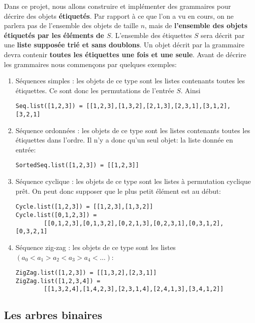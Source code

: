 \documentclass[11pt]{article}
\begin{document}
Dans ce projet, nous allons construire et implémenter des grammaires pour
décrire des objets \textbf{étiquetés}. Par rapport à ce que l'on a vu en
cours, on ne parlera pas de l'ensemble des objets de taille $n$, mais de
\textbf{l'ensemble des objets étiquetés par les éléments de $S$}. L'ensemble
des étiquettes $S$ sera décrit par une \textbf{liste supposée trié et sans
  doublons}. Un objet décrit par la grammaire devra contenir \textbf{toutes
  les étiquettes une fois et une seule}. Avant de décrire les grammaires nous
commençons par quelques exemples:
\begin{enumerate}
\item Séquences simples : les objets de ce type sont les listes contenants
  toutes les étiquettes. Ce sont donc les permutations de l'entrée $S$. Ainsi
\begin{verbatim}
Seq.list([1,2,3]) = [[1,2,3],[1,3,2],[2,1,3],[2,3,1],[3,1,2],[3,2,1]
\end{verbatim}
\item Séquence ordonnées : les objets de ce type sont les listes contenants
  toutes les étiquettes dans l'ordre. Il n'y a donc qu'un seul objet: la liste
  donnée en entrée:
\begin{verbatim}
SortedSeq.list([1,2,3]) = [[1,2,3]]
\end{verbatim}
\item Séquence cyclique : les objets de ce type sont les listes à permutation
  cyclique prêt. On peut donc supposer que le plus petit élément est au début:
\begin{verbatim}
Cycle.list([1,2,3]) = [[1,2,3],[1,3,2]]
Cycle.list([0,1,2,3]) =
        [[0,1,2,3],[0,1,3,2],[0,2,1,3],[0,2,3,1],[0,3,1,2],[0,3,2,1]
\end{verbatim}
\item Séquence zig-zag : les objets de ce type sont les listes
  $(a_0<a_1>a_2<a_3>a_4<\dots)$:
\begin{verbatim}
ZigZag.list([1,2,3]) = [[1,3,2],[2,3,1]]
ZigZag.list([1,2,3,4]) =
        [[1,3,2,4],[1,4,2,3],[2,3,1,4],[2,4,1,3],[3,4,1,2]]
\end{verbatim}
\end{enumerate}

\subsection{Les arbres binaires}
\end{document}
